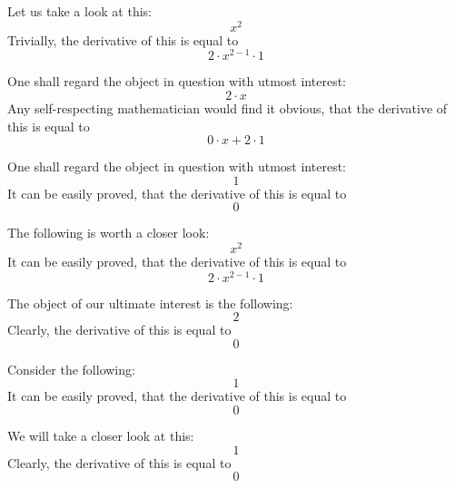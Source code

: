 \documentclass{article}
\begin{document}
Let us take a look at this:
\begin{equation}
x ^{2 } 
\end{equation}
Trivially, the derivative of this is equal to
\begin{equation}
2 \cdot x ^{2 - 1 } \cdot 1 
\end{equation}

One shall regard the object in question with utmost interest:
\begin{equation}
2 \cdot x 
\end{equation}
Any self-respecting mathematician would find it obvious, that the derivative of this is equal to
\begin{equation}
0 \cdot x + 2 \cdot 1 
\end{equation}

One shall regard the object in question with utmost interest:
\begin{equation}
1 
\end{equation}
It can be easily proved, that the derivative of this is equal to
\begin{equation}
0 
\end{equation}

The following is worth a closer look:
\begin{equation}
x ^{2 } 
\end{equation}
It can be easily proved, that the derivative of this is equal to
\begin{equation}
2 \cdot x ^{2 - 1 } \cdot 1 
\end{equation}

The object of our ultimate interest is the following:
\begin{equation}
2 
\end{equation}
Clearly, the derivative of this is equal to
\begin{equation}
0 
\end{equation}

Consider the following:
\begin{equation}
1 
\end{equation}
It can be easily proved, that the derivative of this is equal to
\begin{equation}
0 
\end{equation}

We will take a closer look at this:
\begin{equation}
1 
\end{equation}
Clearly, the derivative of this is equal to
\begin{equation}
0 
\end{equation}
\end{document}
